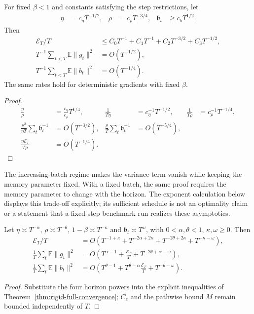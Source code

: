 \begin{corollary}
\label{cor:rigid-canonical-rate}
For fixed $\beta<1$ and constants satisfying the step restrictions, let
\begin{align}
 \eta&=c_\eta T^{-1/2},&\rho&=c_\rho T^{-3/4},&
 \mathfrak b_t&\ge c_bT^{1/2}.
\end{align}
Then
\begin{align}
 \mathscr E_T/T
 &\le C_0T^{-1}+C_1T^{-1}+C_2T^{-3/2}+C_3T^{-1/2},\\
 T^{-1}\sum_{t<T}\mathbb E\|g_t\|^2&=O(T^{-1/2}),\\
 T^{-1}\sum_{t<T}\mathbb E\|b_t\|^2&=O(T^{-1/4}).
\end{align}
The same rates hold for deterministic gradients with fixed $\beta$.
\end{corollary}
\begin{proof}
\begin{align}
 \frac{\eta}{\rho}&=\frac{c_\eta}{c_\rho}T^{1/4},&
 \frac1{T\eta}&=c_\eta^{-1}T^{-1/2},&
 \frac1{T\rho}&=c_\rho^{-1}T^{-1/4},\\
 \frac{\rho^2}{\eta T}\sum_t\mathfrak b_t^{-1}&=O(T^{-3/2}),&
 \frac\rho T\sum_t\mathfrak b_t^{-1}&=O(T^{-5/4}),\\
 \frac{\eta\mathscr E_T}{T\rho}&=O(T^{-1/4}).
\end{align}
\end{proof}

The increasing-batch regime makes the variance term vanish while keeping the memory parameter fixed. With a fixed batch, the same proof requires the memory parameter to change with the horizon. The exponent calculation below displays this trade-off explicitly; its sufficient schedule is not an optimality claim or a statement that a fixed-step benchmark run realizes these asymptotics.

\begin{corollary}
Let $\eta\asymp T^{-\alpha}$, $\rho\asymp T^{-\theta}$,
$1-\beta\asymp T^{-\kappa}$ and $\mathfrak b_t\asymp T^\omega$, with
$0<\alpha,\theta<1$, $\kappa,\omega\ge0$. Then
\begin{align}
 \mathscr E_T/T
 &=O\left(T^{-1+\kappa}+T^{-2\alpha+2\kappa}
 +T^{-2\theta+2\kappa}+T^{-\kappa-\omega}\right),\\
 \frac1T\sum_t\mathbb E\|g_t\|^2
 &=O\left(T^{\alpha-1}+\frac{\mathscr E_T}T+
 T^{-2\theta+\alpha-\omega}\right),\\
 \frac1T\sum_t\mathbb E\|b_t\|^2
 &=O\left(T^{\theta-1}+T^{\theta-\alpha}\frac{\mathscr E_T}T+
 T^{-\theta-\omega}\right).
\end{align}
\end{corollary}
\begin{proof}
Substitute the four horizon powers into the explicit inequalities of Theorem~\ref{thm:rigid-full-convergence}; $C_e$ and the pathwise bound $M$ remain bounded independently of $T$.
\end{proof}


